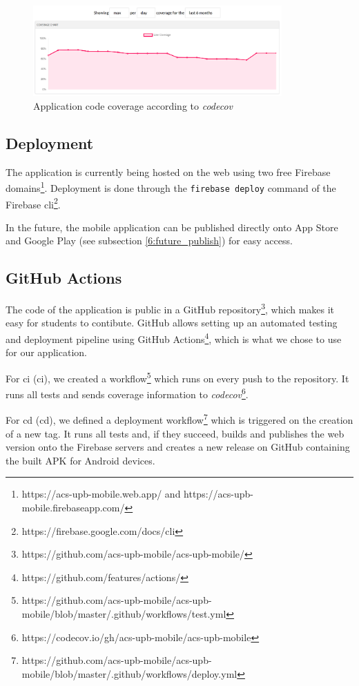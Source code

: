 \begin{figure}[!ht]
    \centering
     \includegraphics[width=0.85\textwidth]{figures/charts/codecov.png}
     \caption{Application code coverage according to \textit{codecov}}
     \hfill
    \label{5:fig:codecov}
\end{figure}

\subsection{Deployment} \label{5:cicd_deployment}
The application is currently being hosted on the web using two free Firebase domains\footnote{https://acs-upb-mobile.web.app/ and https://acs-upb-mobile.firebaseapp.com/}. Deployment is done through the \texttt{firebase deploy} command of the Firebase \acrshort{cli}\footnote{https://firebase.google.com/docs/cli}.

In the future, the mobile application can be published directly onto App Store and Google Play (see subsection \ref{6:future_publish}) for easy access.

\subsection{GitHub Actions} \label{5:cicd_actions}

The code of the application is public in a GitHub repository\footnote{https://github.com/acs-upb-mobile/acs-upb-mobile/}, which makes it easy for students to contibute. GitHub allows setting up an automated testing and deployment pipeline using GitHub Actions\footnote{https://github.com/features/actions/}, which is what we chose to use for our application.

For \acrlong{ci} (\acrshort{ci}), we created a workflow\footnote{https://github.com/acs-upb-mobile/acs-upb-mobile/blob/master/.github/workflows/test.yml} which runs on every push to the repository. It runs all tests and sends coverage information to \textit{codecov}\footnote{https://codecov.io/gh/acs-upb-mobile/acs-upb-mobile}.

For \acrlong{cd} (\acrshort{cd}), we defined a deployment workflow\footnote{https://github.com/acs-upb-mobile/acs-upb-mobile/blob/master/.github/workflows/deploy.yml} which is triggered on the creation of a new tag. It runs all tests and, if they succeed, builds and publishes the web version onto the Firebase servers and creates a new release on GitHub containing the built APK for Android devices. 